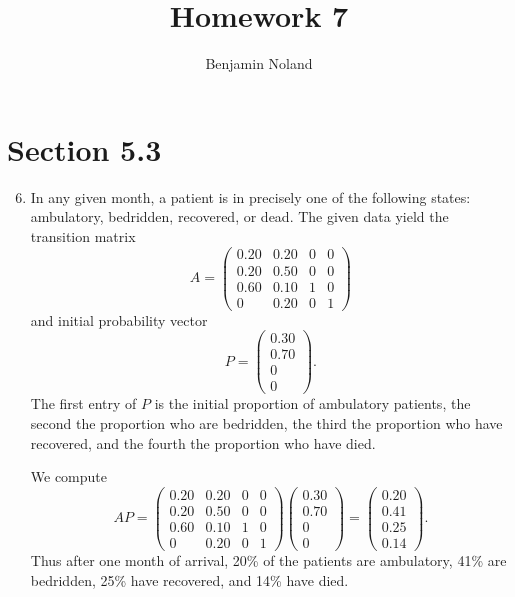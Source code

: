 \documentclass[12pt]{article}
\title{Homework 7}
\author{Benjamin Noland}
\date{}
\begin{document}
\maketitle

\section*{Section 5.3}

\begin{enumerate}
\setcounter{enumi}{5}
\item
In any given month, a patient is in precisely one of the following states: ambulatory, bedridden, recovered, or dead. The given data yield the transition matrix
\begin{equation*}
A = \begin{pmatrix}
0.20 & 0.20 & 0 & 0 \\
0.20 & 0.50 & 0 & 0 \\
0.60 & 0.10 & 1 & 0 \\
0 & 0.20 & 0 & 1
\end{pmatrix}
\end{equation*}
and initial probability vector
\begin{equation*}
P = \begin{pmatrix}
0.30 \\
0.70 \\
0 \\
0
\end{pmatrix}.
\end{equation*}
The first entry of $P$ is the initial proportion of ambulatory patients, the second the proportion who are bedridden, the third the proportion who have recovered, and the fourth the proportion who have died.

We compute
\begin{equation*}
AP = \begin{pmatrix}
0.20 & 0.20 & 0 & 0 \\
0.20 & 0.50 & 0 & 0 \\
0.60 & 0.10 & 1 & 0 \\
0 & 0.20 & 0 & 1
\end{pmatrix}
\begin{pmatrix}
0.30 \\
0.70 \\
0 \\
0
\end{pmatrix}
= \begin{pmatrix}
0.20 \\
0.41 \\
0.25 \\
0.14
\end{pmatrix}.
\end{equation*}
Thus after one month of arrival, 20\% of the patients are ambulatory, 41\% are bedridden, 25\% have recovered, and 14\% have died.


\end{enumerate}
\end{document}
